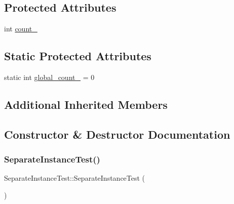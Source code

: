 \subsection*{Protected Attributes}
\begin{DoxyCompactItemize}
\item 
int \mbox{\hyperlink{class_separate_instance_test_a04af1b3b711671ecb0778af1330a740f}{count\+\_\+}}
\end{DoxyCompactItemize}
\subsection*{Static Protected Attributes}
\begin{DoxyCompactItemize}
\item 
static int \mbox{\hyperlink{class_separate_instance_test_a79db6d4cdd6c99b256439cc020f782ef}{global\+\_\+count\+\_\+}} = 0
\end{DoxyCompactItemize}
\subsection*{Additional Inherited Members}


\subsection{Constructor \& Destructor Documentation}
\mbox{\label{class_separate_instance_test_a50a822b67bbc10d44701d213c2849b09}} 
\subsubsection{\texorpdfstring{SeparateInstanceTest()}{SeparateInstanceTest()}\hspace{0.1cm}{\footnotesize\ttfamily [1/3]}}
{\footnotesize\ttfamily Separate\+Instance\+Test\+::\+Separate\+Instance\+Test (\begin{DoxyParamCaption}{ }\end{DoxyParamCaption})\hspace{0.3cm}{\ttfamily [inline]}}

\mbox{\label{class_separate_instance_test_a50a822b67bbc10d44701d213c2849b09}} 
